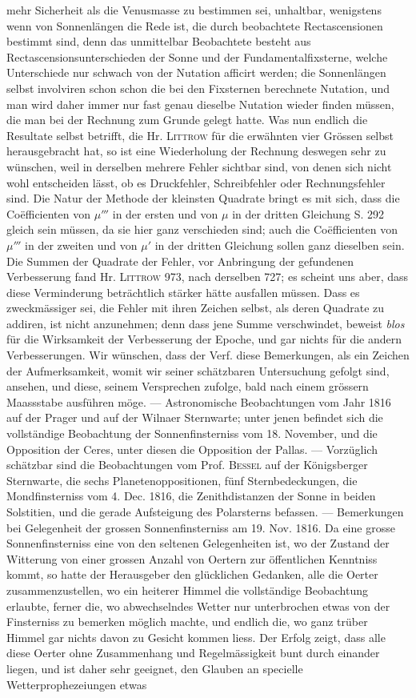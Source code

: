 mehr Sicherheit als die Venusmasse zu bestimmen sei, unhaltbar, wenigstens wenn von Sonnenlängen die Rede ist, die durch beobachtete Rectascensionen bestimmt sind, denn das unmittelbar Beobachtete besteht aus Rectascensionsunterschieden der Sonne und der Fundamentalfixsterne, welche Unterschiede nur schwach von der Nutation afficirt werden; die Sonnenlängen selbst involviren schon schon die bei den Fixsternen berechnete Nutation, und man wird daher immer nur fast genau dieselbe Nutation wieder finden müssen, die man bei der Rechnung zum Grunde gelegt hatte. Was nun endlich die Resultate selbst betrifft, die Hr. \textsc{Littrow} für die erwähnten vier Grössen selbst herausgebracht hat, so ist eine Wiederholung der Rechnung deswegen sehr zu wünschen, weil in derselben mehrere Fehler sichtbar sind, von denen sich nicht wohl entscheiden lässt, ob es Druckfehler, Schreibfehler oder Rechnungsfehler sind. Die Natur der Methode der kleinsten Quadrate bringt es mit sich, dass die Coëfficienten von $\mu'''$ in der ersten und von $\mu$ in der dritten Gleichung S. 292 gleich sein müssen, da sie hier ganz verschieden sind; auch die Coëfficienten von $\mu'''$ in der zweiten und von $\mu'$ in der dritten Gleichung sollen ganz dieselben sein. Die Summen der Quadrate der Fehler, vor Anbringung der gefundenen Verbesserung fand Hr. \textsc{Littrow} 973, nach derselben 727; es scheint uns aber, dass diese Verminderung beträchtlich stärker hätte ausfallen müssen. Dass es zweckmässiger sei, die Fehler mit ihren Zeichen selbst, als deren Quadrate zu addiren, ist nicht anzunehmen; denn dass jene Summe verschwindet, beweist \emph{blos} für die Wirksamkeit der Verbesserung der Epoche, und gar nichts für die andern Verbesserungen. Wir wünschen, dass der Verf. diese Bemerkungen, als ein Zeichen der Aufmerksamkeit, womit wir seiner schätzbaren Untersuchung gefolgt sind, ansehen, und diese, seinem Versprechen zufolge, bald nach einem grössern Maassstabe ausführen möge. --- Astronomische Beobachtungen vom Jahr 1816 auf der Prager und auf der Wilnaer Sternwarte; unter jenen befindet sich die vollständige Beobachtung der Sonnenfinsterniss vom 18. November, und die Opposition der Ceres, unter diesen die Opposition der Pallas. --- Vorzüglich schätzbar sind die Beobachtungen vom Prof. \textsc{Bessel} auf der Königsberger Sternwarte, die sechs Planetenoppositionen, fünf Sternbedeckungen, die Mondfinsterniss vom 4. Dec. 1816, die Zenithdistanzen der Sonne in beiden Solstitien, und die gerade Aufsteigung des Polarsterns befassen. --- Bemerkungen bei Gelegenheit der grossen Sonnenfinsterniss am 19. Nov. 1816. Da eine grosse Sonnenfinsterniss eine von den seltenen Gelegenheiten ist, wo der Zustand der Witterung von einer grossen Anzahl von Oertern zur öffentlichen Kenntniss kommt, so hatte der Herausgeber den glücklichen Gedanken, alle die Oerter zusammenzustellen, wo ein heiterer Himmel die vollständige Beobachtung erlaubte, ferner die, wo abwechselndes Wetter nur unterbrochen etwas von der Finsterniss zu bemerken möglich machte, und endlich die, wo ganz trüber Himmel gar nichts davon zu Gesicht kommen liess. Der Erfolg zeigt, dass alle diese Oerter ohne Zusammenhang und Regelmässigkeit bunt durch einander liegen, und ist daher sehr geeignet, den Glauben an specielle Wetterprophezeiungen etwas 